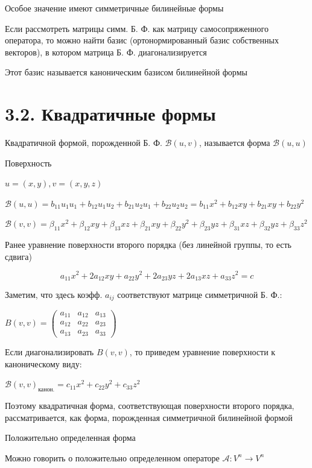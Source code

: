 \documentclass[12pt]{article}
\begin{document}
    \Nota Особое значение имеют симметричные билинейные формы

    Если рассмотреть матрицы симм. Б. Ф. как матрицу самосопряженного оператора, то можно найти базис
    (ортонормированный базис собственных векторов), в котором матрица Б. Ф. диагонализируется

    Этот базис называется каноническим базисом билинейной формы

    \section{3.2. Квадратичные формы}

    \Def Квадратичной формой, порожденной Б. Ф. $\mathcal{B}(u, v)$, называется форма $\mathcal{B}(u, u)$

    \Ex Поверхность

    $u = (x, y), v = (x, y, z)$

    $\mathcal{B}(u, u) = b_{11}u_1 u_1 + b_{12} u_1 u_2 + b_{21} u_2 u_1 + b_{22} u_2 u_2 = b_{11} x^2 + b_{12}xy + b_{21}xy + b_{22}y^2$

    $\mathcal{B}(v, v) = \beta_{11} x^2 + \beta_{12}xy + \beta_{13}xz + \beta_{21} xy + \beta_{22}y^2 + \beta_{23}yz + \beta_{31} xz + \beta_{32}yz + \beta_{33}z^2$

    \Mem Ранее уравнение поверхности второго порядка (без линейной группы, то есть сдвига)

    \[a_{11}x^2 + 2a_{12}xy + a_{22}y^2 + 2a_{23}yz + 2a_{13}xz + a_{33}z^2 = c\]

    \Nota Заметим, что здесь коэфф. $a_{ij}$ соответствуют матрице симметричной Б. Ф.:

    $B(v, v) = \begin{pmatrix}a_{11} & a_{12} & a_{13} \\ a_{12} & a_{22} & a_{23} \\ a_{13} & a_{23} & a_{33}\end{pmatrix}$

    Если диагонализировать $B(v, v)$, то приведем уравнение поверхности к каноническому виду:

    $\mathcal{B}(v, v)_{\text{канон.}} = c_{11}x^2 + c_{22}y^2 + c_{33}z^2$

    Поэтому квадратичная форма, соответствующая поверхности второго порядка, рассматривается, как форма, порожденная симметричной билинейной формой

    \Def Положительно определенная форма

    \Nota Можно говорить о положительно определенном операторе $\mathcal{A}: V^n \rightarrow V^n$
\end{document}
